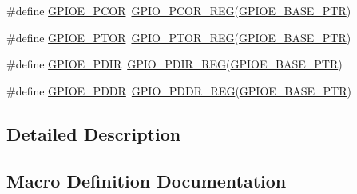 \begin{DoxyCompactItemize}
\item 
\#define \hyperlink{group___g_p_i_o___register___accessor___macros_gae47e95a0795236c55495e95b67dc6540}{G\+P\+I\+O\+E\+\_\+\+P\+C\+OR}~\hyperlink{group___g_p_i_o___register___accessor___macros_ga97e0b9004936c347bd4728e34a5bd5cf}{G\+P\+I\+O\+\_\+\+P\+C\+O\+R\+\_\+\+R\+EG}(\hyperlink{group___g_p_i_o___peripheral_ga5d17758f0829d938753761d4a53c0a7c}{G\+P\+I\+O\+E\+\_\+\+B\+A\+S\+E\+\_\+\+P\+TR})
\item 
\#define \hyperlink{group___g_p_i_o___register___accessor___macros_ga0d6201794a479eb4530b4deedf9f7471}{G\+P\+I\+O\+E\+\_\+\+P\+T\+OR}~\hyperlink{group___g_p_i_o___register___accessor___macros_gac6579b41a85fbb464dacde9472ad7d83}{G\+P\+I\+O\+\_\+\+P\+T\+O\+R\+\_\+\+R\+EG}(\hyperlink{group___g_p_i_o___peripheral_ga5d17758f0829d938753761d4a53c0a7c}{G\+P\+I\+O\+E\+\_\+\+B\+A\+S\+E\+\_\+\+P\+TR})
\item 
\#define \hyperlink{group___g_p_i_o___register___accessor___macros_gab12c5a1580446153a220ff5fadf052bd}{G\+P\+I\+O\+E\+\_\+\+P\+D\+IR}~\hyperlink{group___g_p_i_o___register___accessor___macros_ga2c24da45995f7a27504c3789daae14ce}{G\+P\+I\+O\+\_\+\+P\+D\+I\+R\+\_\+\+R\+EG}(\hyperlink{group___g_p_i_o___peripheral_ga5d17758f0829d938753761d4a53c0a7c}{G\+P\+I\+O\+E\+\_\+\+B\+A\+S\+E\+\_\+\+P\+TR})
\item 
\#define \hyperlink{group___g_p_i_o___register___accessor___macros_ga4ca5e050e0a711260b6d4dd0d3eabe76}{G\+P\+I\+O\+E\+\_\+\+P\+D\+DR}~\hyperlink{group___g_p_i_o___register___accessor___macros_ga61dac233f8be25e95cd419eb79714a07}{G\+P\+I\+O\+\_\+\+P\+D\+D\+R\+\_\+\+R\+EG}(\hyperlink{group___g_p_i_o___peripheral_ga5d17758f0829d938753761d4a53c0a7c}{G\+P\+I\+O\+E\+\_\+\+B\+A\+S\+E\+\_\+\+P\+TR})
\end{DoxyCompactItemize}


\subsection{Detailed Description}


\subsection{Macro Definition Documentation}
\mbox{\label{group___g_p_i_o___register___accessor___macros_ga97e0b9004936c347bd4728e34a5bd5cf}} 
